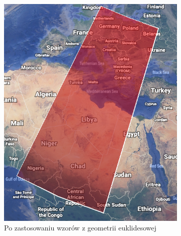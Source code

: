 \begin{figure}[H]
    \begin{subfigure}{0.59\textwidth}
        \centering
        \includegraphics[width=0.9\linewidth]{photos/method1.png}
        \caption{Po zastosowaniu wzorów z geometrii euklidesowej}
    \end{subfigure}
    \begin{subfigure}{0.41\textwidth}
        \centering

\end{subfigure}
\end{figure}
